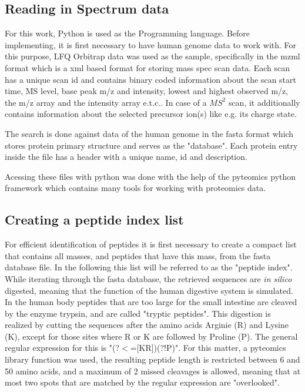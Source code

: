 \documentclass[11pt]{article}
\begin{document}
\subsection{Reading in Spectrum data}

For this work, Python is used as the Programming language. Before implementing, it is first necessary to have human genome data to work with. For this purpose, LFQ Orbitrap data was used as the sample, specifically in the mzml format which is a xml based format for storing mass spec scan data. Each scan has a unique scan id and contains binary coded information about the scan start time, MS level, base peak m/z and intensity, lowest and highest observed m/z, the m/z array and the intensity array e.t.c.. In case of a \(MS^2\) scan, it additionally contains information about the selected precursor ion(s) like e.g. its charge state.

The search is done against data of the human genome in the fasta format which stores protein primary structure and serves as the "database". Each protein entry inside the file has a header with a unique name, id and description.

Acessing these files with python was done with the help of the pyteomics python framework \cite{pyteomics, pyteomics-five-years} which contains many tools for working with proteomics data. 

\subsection{Creating a peptide index list}
For efficient identification of peptides it is first necessary to create a compact list that contains all masses, and peptides that have this mass, from the fasta database file. In the following this list will be referred to as the "peptide index". While iterating through the fasta database, the retrieved sequences are \textit{in silico} digested, meaning that the function of the human digestive system is simulated. In the human body peptides that are too large for the small intestine are cleaved by the enzyme trypsin, and are called "tryptic peptides". This digestion is realized by cutting the sequences after the amino acids Arginie (R) and Lysine (K), except for those sites where R or K are followed by Proline (P). The general regular expression for this is "(?$<$=[KR])(?!P)". For this matter, a pyteomics library function was used, the resulting peptide length is restricted between 6 and 50 amino acids, and a maximum of 2 missed cleavages is allowed, meaning that at most two spots that are matched by the regular expression are "overlooked". 
\end{document}
